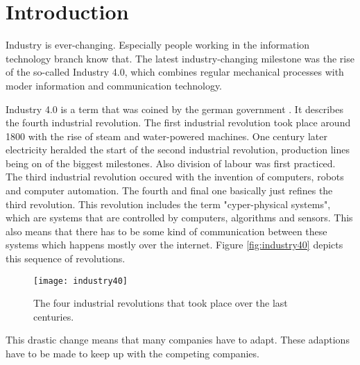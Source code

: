 \chapter{Introduction}
\label{ch:Introduction}




Industry is ever-changing. Especially people working in the information technology branch know that. The latest industry-changing milestone was the rise of the so-called Industry 4.0, which combines regular mechanical processes with moder information and communication technology.

Industry 4.0 is a term that was coined by the german government \cite{Industrie4.0Paper}. It describes the fourth industrial revolution. The first industrial revolution took place around 1800 with the rise of steam and water-powered machines. One century later electricity heralded the start of the second industrial revolution, production lines being on of the biggest milestones. Also division of labour was first practiced. The third industrial revolution occured with the invention of computers, robots and computer automation. The fourth and final one basically just refines the third revolution. This revolution includes the term "cyper-physical systems", which are systems that are controlled by computers, algorithms and sensors. This also means that there has to be some kind of communication between these systems which happens mostly over the internet. Figure \vref{fig:industry40} depicts this sequence of revolutions.


\begin{figure}[H]
    \centering
    \texttt{[image: industry40]}
    \caption{The four industrial revolutions that took place over the last centuries. \cite{img:industry4.0}}
    \label{fig:industry40}
\end{figure}

This drastic change means that many companies have to adapt. These adaptions have to be made to keep up with the competing companies.

